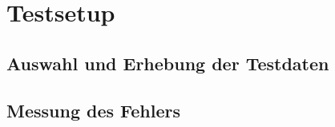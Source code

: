 \section{Testsetup}

\subsection{Auswahl und Erhebung der Testdaten}

\subsection{Messung des Fehlers}


